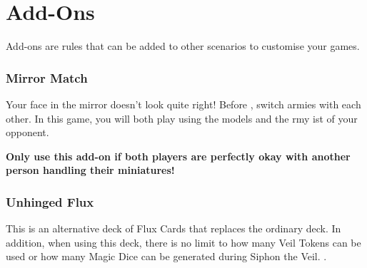 \part*{Add-Ons}
\label{add_ons}

Add-ons are rules that can be added to other scenarios to customise your games.

\section*{Mirror Match}

Your face in the mirror doesn't look quite right! Before , switch armies with each other. In this game, you will both play using the models and the rmy ist of your opponent.

\textbf{Only use this add-on if both players are perfectly okay with another person handling their miniatures!}

\section*{Unhinged Flux}

This is an alternative deck of Flux Cards that replaces the ordinary deck. In addition, when using this deck, there is no limit to how many Veil Tokens can be used or how many Magic Dice can be generated during Siphon the Veil. .

